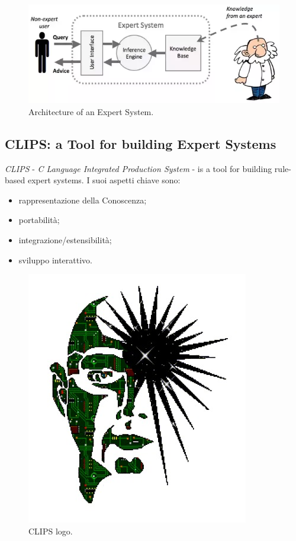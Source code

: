 \documentclass[12pt]{article}
\begin{document}
\begin{figure}[h]
\centering
\includegraphics[scale = 0.6]{img/arch.png}
\caption{Architecture of an Expert System.}
\end{figure}


\subsection{CLIPS: a Tool for building Expert Systems}
\textit{CLIPS} - \textit{C Language Integrated Production System} - is a tool for building rule-based expert systems.
I suoi aspetti chiave sono:

\begin{itemize}
\item rappresentazione della Conoscenza;
\item portabilità;
\item integrazione/estensibilità;
\item sviluppo interattivo.
\end{itemize}

\begin{figure}[h]
\centering
\includegraphics[scale = 0.16]{img/clips.jpg}
\caption{CLIPS logo.}
\end{figure}
\end{document}
